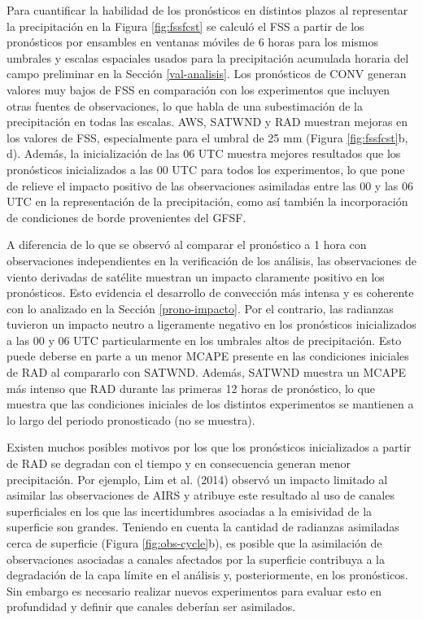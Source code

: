 \documentclass[12pt,oneside,a4paper]{reedthesis}
\begin{document}
Para cuantificar la habilidad de los pronósticos en distintos plazos al representar la precipitación en la Figura \ref{fig:fssfcst} se calculó el FSS a partir de los pronósticos por ensambles en ventanas móviles de 6 horas para los mismos umbrales y escalas espaciales usados para la precipitación acumulada horaria del campo preliminar en la Sección \ref{val-analisis}. Los pronósticos de CONV generan valores muy bajos de FSS en comparación con los experimentos que incluyen otras fuentes de observaciones, lo que habla de una subestimación de la precipitación en todas las escalas. AWS, SATWND y RAD muestran mejoras en los valores de FSS, especialmente para el umbral de 25 mm (Figura \ref{fig:fssfcst}b, d). Además, la inicialización de las 06 UTC muestra mejores resultados que los pronósticos inicializados a las 00 UTC para todos los experimentos, lo que pone de relieve el impacto positivo de las observaciones asimiladas entre las 00 y las 06 UTC en la representación de la precipitación, como así también la incorporación de condiciones de borde provenientes del GFSF.

A diferencia de lo que se observó al comparar el pronóstico a 1 hora con observaciones independientes en la verificación de los análisis, las observaciones de viento derivadas de satélite muestran un impacto claramente positivo en los pronósticos. Esto evidencia el desarrollo de convección más intensa y es coherente con lo analizado en la Sección \ref{prono-impacto}. Por el contrario, las radianzas tuvieron un impacto neutro a ligeramente negativo en los pronósticos inicializados a las 00 y 06 UTC particularmente en los umbrales altos de precipitación. Esto puede deberse en parte a un menor MCAPE presente en las condiciones iniciales de RAD al compararlo con SATWND. Además, SATWND muestra un MCAPE más intenso que RAD durante las primeras 12 horas de pronóstico, lo que muestra que las condiciones iniciales de los distintos experimentos se mantienen a lo largo del periodo pronosticado (no se muestra).

Existen muchos posibles motivos por los que los pronósticos inicializados a partir de RAD se degradan con el tiempo y en consecuencia generan menor precipitación. Por ejemplo, Lim et al. (2014) observó un impacto limitado al asimilar las observaciones de AIRS y atribuye este resultado al uso de canales superficiales en los que las incertidumbres asociadas a la emisividad de la superficie son grandes. Teniendo en cuenta la cantidad de radianzas asimiladas cerca de superficie (Figura \ref{fig:obs-cycle}b), es posible que la asimilación de observaciones asociadas a canales afectados por la superficie contribuya a la degradación de la capa límite en el análisis y, posteriormente, en los pronósticos. Sin embargo es necesario realizar nuevos experimentos para evaluar esto en profundidad y definir que canales deberían ser asimilados.
\end{document}
